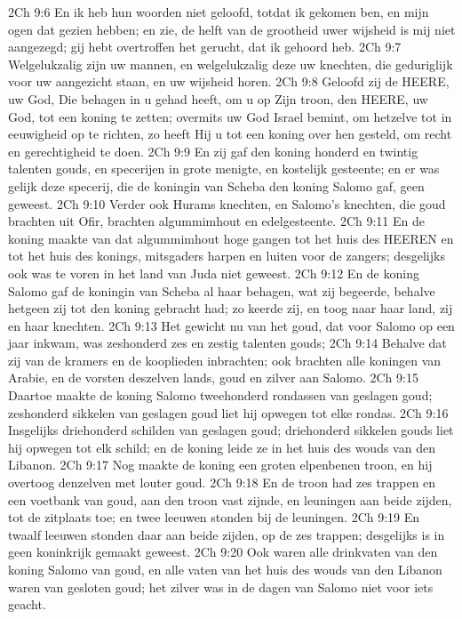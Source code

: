 2Ch 9:6  En ik heb hun woorden niet geloofd, totdat ik gekomen ben, en mijn ogen dat gezien hebben; en zie, de helft van de grootheid uwer wijsheid is mij niet aangezegd; gij hebt overtroffen het gerucht, dat ik gehoord heb.
2Ch 9:7  Welgelukzalig zijn uw mannen, en welgelukzalig deze uw knechten, die geduriglijk voor uw aangezicht staan, en uw wijsheid horen.
2Ch 9:8  Geloofd zij de HEERE, uw God, Die behagen in u gehad heeft, om u op Zijn troon, den HEERE, uw God, tot een koning te zetten; overmits uw God Israel bemint, om hetzelve tot in eeuwigheid op te richten, zo heeft Hij u tot een koning over hen gesteld, om recht en gerechtigheid te doen.
2Ch 9:9  En zij gaf den koning honderd en twintig talenten gouds, en specerijen in grote menigte, en kostelijk gesteente; en er was gelijk deze specerij, die de koningin van Scheba den koning Salomo gaf, geen geweest.
2Ch 9:10  Verder ook Hurams knechten, en Salomo's knechten, die goud brachten uit Ofir, brachten algummimhout en edelgesteente.
2Ch 9:11  En de koning maakte van dat algummimhout hoge gangen tot het huis des HEEREN en tot het huis des konings, mitsgaders harpen en luiten voor de zangers; desgelijks ook was te voren in het land van Juda niet geweest.
2Ch 9:12  En de koning Salomo gaf de koningin van Scheba al haar behagen, wat zij begeerde, behalve hetgeen zij tot den koning gebracht had; zo keerde zij, en toog naar haar land, zij en haar knechten.
2Ch 9:13  Het gewicht nu van het goud, dat voor Salomo op een jaar inkwam, was zeshonderd zes en zestig talenten gouds;
2Ch 9:14  Behalve dat zij van de kramers en de kooplieden inbrachten; ook brachten alle koningen van Arabie, en de vorsten deszelven lands, goud en zilver aan Salomo.
2Ch 9:15  Daartoe maakte de koning Salomo tweehonderd rondassen van geslagen goud; zeshonderd sikkelen van geslagen goud liet hij opwegen tot elke rondas.
2Ch 9:16  Insgelijks driehonderd schilden van geslagen goud; driehonderd sikkelen gouds liet hij opwegen tot elk schild; en de koning leide ze in het huis des wouds van den Libanon.
2Ch 9:17  Nog maakte de koning een groten elpenbenen troon, en hij overtoog denzelven met louter goud.
2Ch 9:18  En de troon had zes trappen en een voetbank van goud, aan den troon vast zijnde, en leuningen aan beide zijden, tot de zitplaats toe; en twee leeuwen stonden bij de leuningen.
2Ch 9:19  En twaalf leeuwen stonden daar aan beide zijden, op de zes trappen; desgelijks is in geen koninkrijk gemaakt geweest.
2Ch 9:20  Ook waren alle drinkvaten van den koning Salomo van goud, en alle vaten van het huis des wouds van den Libanon waren van gesloten goud; het zilver was in de dagen van Salomo niet voor iets geacht.
